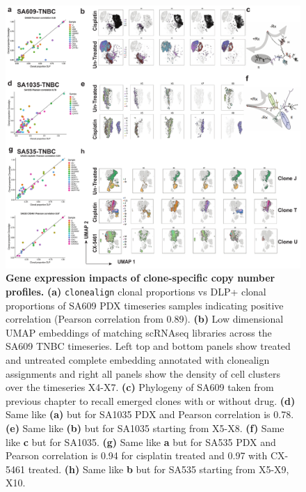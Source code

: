 \begin{figure}
\centering
\includegraphics[width=\textwidth]{Figures/fig2_clonealignembeddings.pdf}
	
\caption[Gene expression impacts of clone-specific copy number profiles]
	{\small
	\textbf{Gene expression impacts of clone-specific copy number profiles.}
	   \textbf{(a)} \texttt{clonealign} clonal proportions vs DLP+ clonal proportions of SA609 PDX timeseries samples indicating positive correlation (Pearson correlation from 0.89).
	    \textbf{(b)} Low dimensional \ac{UMAP} embeddings of matching scRNAseq libraries across the SA609 TNBC timeseries. Left top and bottom panels show treated and untreated complete embedding annotated with clonealign assignments and right all panels show the density of cell clusters over the timeseries X4-X7.
	     \textbf{(c)} Phylogeny of SA609 taken from previous chapter to recall emerged clones with or without drug. 
	     \textbf{(d)} Same like \textbf{(a)} but for SA1035 PDX and Pearson correlation is 0.78. \textbf{(e)} Same like \textbf{(b)} but for SA1035 starting from X5-X8. \textbf{(f)} Same like \textbf{c} but for SA1035. \textbf{(g)} Same like \textbf{a} but for SA535 PDX and Pearson correlation is 0.94 for cisplatin treated and 0.97 with CX-5461 treated. \textbf{(h)} Same like \textbf{b} but for SA535 starting from X5-X9, X10.
	}
	\label{fig:fig2_clonealignembeddings.pdf}
\end{figure}




